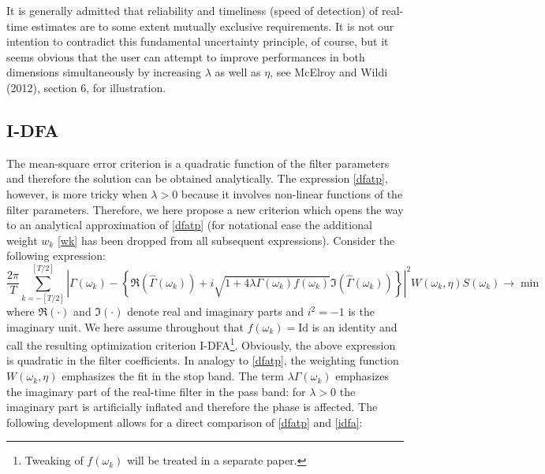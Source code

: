 \documentclass[11pt]{article}
\begin{document}
It is generally admitted that reliability and timeliness (speed of detection) of real-time estimates are to some extent mutually exclusive requirements. It is not our intention to contradict this fundamental uncertainty principle, of course, but it seems obvious that the user can attempt to improve performances in both dimensions simultaneously by increasing $\lambda$ as well as $\eta$, see McElroy and Wildi (2012), section 6, for illustration. \\






\subsection{I-DFA}\label{idfas}

The mean-square error criterion is a quadratic function of the filter parameters and therefore the solution can be obtained analytically. The expression \ref{dfatp}, however, is more tricky when $\lambda>0$ because it involves non-linear functions of the filter parameters. Therefore, we here propose a new criterion which opens the way to an analytical approximation of \ref{dfatp} (for notational ease the additional weight $w_k$ \ref{wk} has been dropped from all subsequent expressions). Consider the following expression:
\begin{equation}\label{idfa}
\frac{2\pi}{T} \sum_{k=-[T/2]}^{[T/2]}
 \left|\Gamma(\omega_k)-\left\{\Re\left(\hat{\Gamma}(\omega_k)\right)+i\sqrt{1+4\lambda\Gamma(\omega_k)f(\omega_k)}\Im\left(\hat{\Gamma}(\omega_k)\right)\right\}\right|^2 W(\omega_k,\eta)S(\omega_k)\to\min
\end{equation}
where $\Re(\cdot)$ and $\Im(\cdot)$ denote real and imaginary parts and $i^2=-1$ is the imaginary unit. We here assume throughout that $f(\omega_k)=\textrm{Id}$ is an identity and call the resulting optimization criterion I-DFA\footnote{Tweaking of $f(\omega_k)$ will be treated in a separate paper.}. Obviously, the above expression is quadratic in the filter coefficients. In analogy to \ref{dfatp}, the weighting function $W(\omega_k,\eta)$ emphasizes the fit  in the stop band. The term $\lambda\Gamma(\omega_k)$ emphasizes the imaginary part of the real-time filter in the pass band: for $\lambda>0$ the imaginary part is artificially inflated and therefore the phase is affected. The following development allows for a direct comparison of \ref{dfatp} and \ref{idfa}:\\
\end{document}
